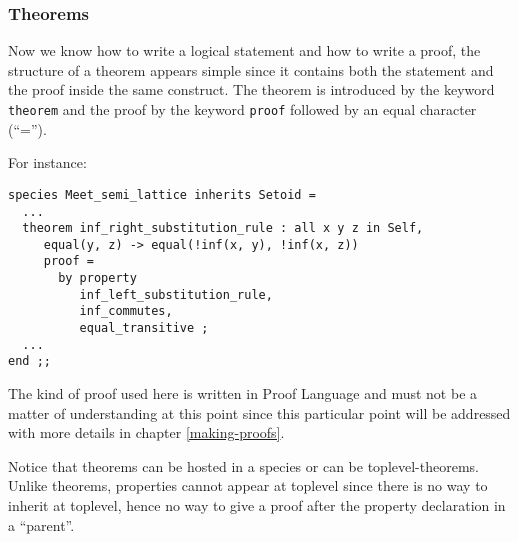 \subsubsection{Theorems}
Now we know how to write a logical statement and how
to write a proof, the structure of a theorem appears simple since it
contains both the statement and the proof inside the same
construct. The theorem is introduced by the keyword {\tt theorem} and
the proof by the keyword {\tt proof} followed by an equal character
(``='').
\begin{syn}
 \is
    \tok{:} 
   
\end{syn}


\noindent For instance:
{\scriptsize
\begin{lstlisting}
species Meet_semi_lattice inherits Setoid =
  ...
  theorem inf_right_substitution_rule : all x y z in Self,
     equal(y, z) -> equal(!inf(x, y), !inf(x, z))
     proof =
       by property
          inf_left_substitution_rule,
          inf_commutes,
          equal_transitive ;
  ...
end ;;
\end{lstlisting}
}
The kind of proof used here is written in {\focal} Proof Language and
must not be a matter of understanding at this point since this
particular point will be addressed with more details in chapter
\ref{making-proofs}.

Notice that theorems can be hosted in a species or can be
toplevel-theorems.
Unlike theorems, properties cannot appear at
toplevel since there is no way to inherit at toplevel, hence no
way to give a proof after the property declaration in a ``parent''.
